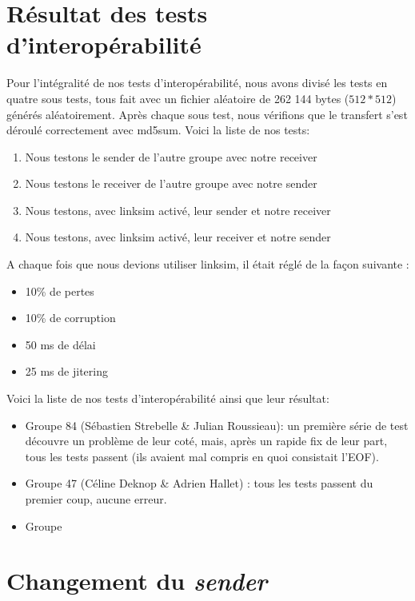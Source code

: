 \documentclass[12pt,notitlepage]{report}
\begin{document}
\begin{appendices}
\section{Résultat des tests d'interopérabilité}
	Pour l'intégralité de nos tests d'interopérabilité, nous avons divisé les tests en quatre sous tests, tous fait avec un fichier aléatoire de 262 144 bytes ($512*512$) générés aléatoirement. Après chaque sous test, nous vérifions que le transfert s'est déroulé correctement avec md5sum. Voici la liste de nos tests:
\begin{enumerate}
\item Nous testons le sender de l'autre groupe avec notre receiver
\item Nous testons le receiver de l'autre groupe avec notre sender
\item Nous testons, avec linksim activé, leur sender et notre receiver
\item Nous testons, avec linksim activé, leur receiver et notre sender
\end{enumerate}	 
	A chaque fois que nous devions utiliser linksim, il était réglé de la façon suivante : 
	\begin{itemize}
	\item 10\% de pertes
	\item 10\% de corruption
	\item 50 ms de délai
	\item 25 ms de jitering
	\end{itemize}

Voici la liste de nos tests  d'interopérabilité ainsi que leur résultat:
\begin{itemize}
\item Groupe 84 (Sébastien Strebelle \& Julian Roussieau): un première série de test découvre un problème  de leur coté, mais, après un rapide fix de leur part, tous les tests passent (ils avaient mal compris en quoi consistait l'EOF).
\item Groupe 47 (Céline Deknop \& Adrien Hallet) : tous les tests passent du premier coup, aucune erreur.
\item Groupe 
\end{itemize}

\section{Changement du \textit{sender}}


\end{appendices}
\end{document}
